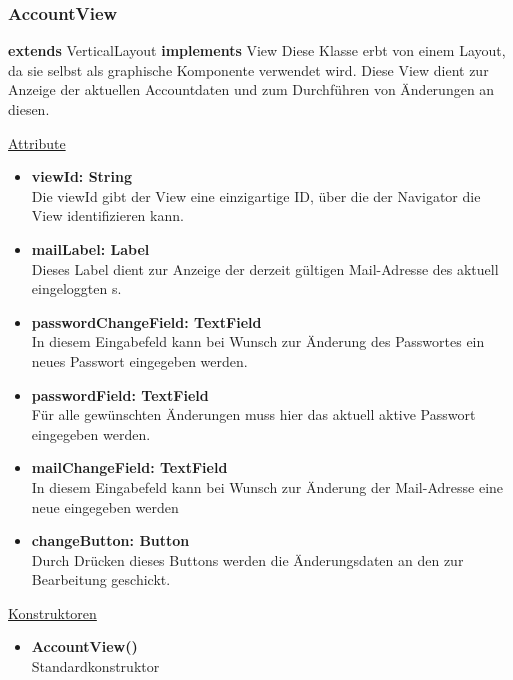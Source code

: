 \newpage
\subsubsection{AccountView}\label{AccountView}
\textbf{extends}  VerticalLayout \newline
\textbf{implements} View \newline
Diese Klasse erbt von einem Layout, da sie selbst als graphische Komponente verwendet wird. Diese View dient zur Anzeige der aktuellen Accountdaten und zum Durchführen von Änderungen an diesen.
\newline

\underline{Attribute}
\begin{itemize}
\itemsep0pt
\item \textbf{viewId: String} \hfill\\ 
Die viewId gibt der View eine einzigartige ID, über die der Navigator die View identifizieren kann.

\item \textbf{mailLabel: Label} \hfill\\ 
Dieses Label dient zur Anzeige der derzeit gültigen Mail-Adresse des aktuell eingeloggten s.

\item \textbf{passwordChangeField: TextField} \hfill\\ 
In diesem Eingabefeld kann bei Wunsch zur Änderung des Passwortes ein neues Passwort eingegeben werden.

\item \textbf{passwordField: TextField} \hfill\\ 
Für alle gewünschten Änderungen muss hier das aktuell aktive Passwort eingegeben werden.

\item \textbf{mailChangeField: TextField} \hfill\\ 
In diesem Eingabefeld kann bei Wunsch zur Änderung der Mail-Adresse eine neue eingegeben werden

\item \textbf{changeButton: Button} \hfill\\
Durch Drücken dieses Buttons werden die Änderungsdaten an den  zur Bearbeitung geschickt.
\end{itemize}

\underline{Konstruktoren}
\begin{itemize}
\itemsep0pt
\item \textbf{AccountView()} \hfill\\
Standardkonstruktor
\end{itemize}


